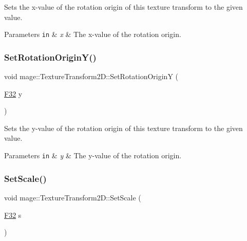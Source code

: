 Sets the x-\/value of the rotation origin of this texture transform to the given value.


\begin{DoxyParams}[1]{Parameters}
\mbox{\tt in}  & {\em x} & The x-\/value of the rotation origin. \\
\hline
\end{DoxyParams}
\mbox{\label{classmage_1_1_texture_transform2_d_a05927d67c0e26c7246d4006bae8debee}} 
\subsubsection{\texorpdfstring{Set\+Rotation\+Origin\+Y()}{SetRotationOriginY()}}
{\footnotesize\ttfamily void mage\+::\+Texture\+Transform2\+D\+::\+Set\+Rotation\+OriginY (\begin{DoxyParamCaption}\item[{\mbox{\hyperlink{namespacemage_aa97e833b45f06d60a0a9c4fc22ae02c0}{F32}}}]{y }\end{DoxyParamCaption})\hspace{0.3cm}{\ttfamily [noexcept]}}

Sets the y-\/value of the rotation origin of this texture transform to the given value.


\begin{DoxyParams}[1]{Parameters}
\mbox{\tt in}  & {\em y} & The y-\/value of the rotation origin. \\
\hline
\end{DoxyParams}
\mbox{\label{classmage_1_1_texture_transform2_d_a41e8b0afcc90386e4445020ad1c19e4e}} 
\subsubsection{\texorpdfstring{Set\+Scale()}{SetScale()}\hspace{0.1cm}{\footnotesize\ttfamily [1/4]}}
{\footnotesize\ttfamily void mage\+::\+Texture\+Transform2\+D\+::\+Set\+Scale (\begin{DoxyParamCaption}\item[{\mbox{\hyperlink{namespacemage_aa97e833b45f06d60a0a9c4fc22ae02c0}{F32}}}]{s }\end{DoxyParamCaption})\hspace{0.3cm}{\ttfamily [noexcept]}}

